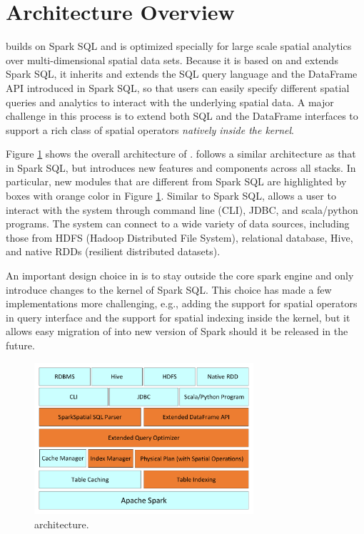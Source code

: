 \section{\name Architecture Overview}
\label{sec:overview}
\name builds on Spark SQL \cite{sparksql} and is optimized specially
for large scale spatial analytics over multi-dimensional spatial data
sets. Because it is based on and extends Spark SQL, it inherits and
extends the SQL query language and the DataFrame API introduced in
Spark SQL, so that users can easily specify different spatial queries
and analytics to interact with the underlying spatial data. A major
challenge in this process is to extend both SQL and the DataFrame
interfaces to support a rich class of spatial operators {\em
  natively inside the \name kernel}.

Figure \ref{fig:architecture} shows the overall architecture of \name.
\name follows a similar architecture as that in Spark SQL, but
introduces new features and components across all stacks. In
particular, new modules that are different from Spark SQL are
highlighted by boxes with orange color in Figure
\ref{fig:architecture}. Similar to Spark SQL, \name allows a user to
interact with the system through command line (CLI), JDBC, and
scala/python programs. The system can connect to a wide variety of
data sources, including those from HDFS (Hadoop Distributed File
System), relational database, Hive, and native RDDs (resilient
distributed datasets).

An important design choice in \name is to stay outside the core spark
engine and only introduce changes to the kernel of Spark SQL. This
choice has made a few implementations more challenging, e.g., adding
the support for spatial operators in query interface and the support
for spatial indexing inside the kernel, but it allows easy migration
of \name into new version of Spark should it be released in the
future.


\begin{figure}[t!]
	\centering
	\includegraphics[width = 3.2in]{figs/architecture}
	\vspace{-4mm}
	\caption{\name architecture.}
	\label{fig:architecture}
	\vspace{-4mm}
\end{figure}

